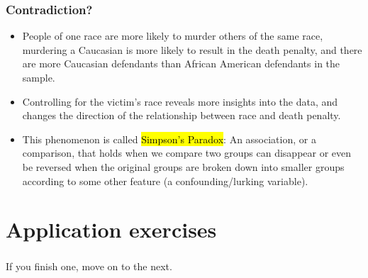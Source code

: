 \documentclass[slidestop,compress,mathserif,12pt,t,professionalfonts,xcolor=table]{beamer}
\begin{document}

\begin{frame}
\frametitle{Contradiction?}

\begin{itemize}

\item People of one race are more likely to murder others of the same race, murdering a Caucasian is more likely to result in the death penalty, and there are more Caucasian defendants than African American defendants in the sample.

\pause

\item Controlling for the victim's race reveals more insights into the data, and changes the direction of the relationship between race and death penalty.

\pause

\item This phenomenon is called \hl{Simpson's Paradox}: An association, or a comparison, that holds when we compare two groups can disappear or even be reversed when the original groups are broken down into smaller groups according to some other feature (a confounding/lurking variable).

\end{itemize}

\end{frame}


\section{Application exercises}


\begin{frame}
\frametitle{}

\vfill

If you finish one, move on to the next.




\vfill

\end{frame}

\end{document}

